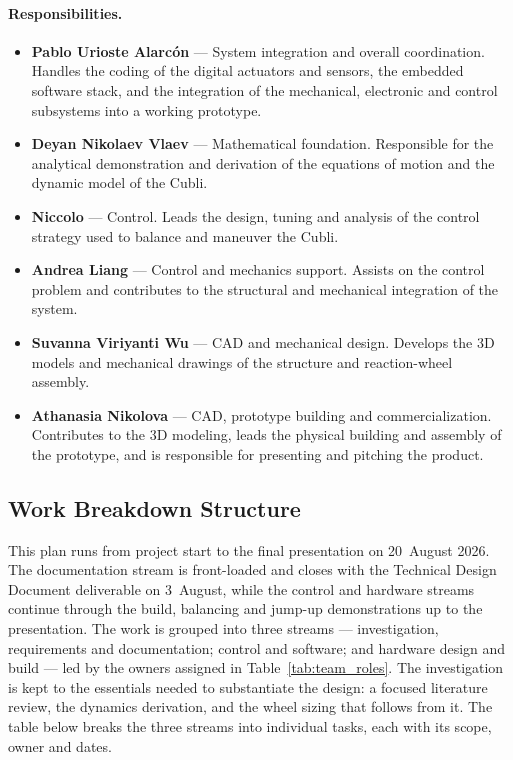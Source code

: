 \paragraph{Responsibilities.}
\begin{itemize}
    \item \textbf{Pablo Urioste Alarcón} --- System integration and overall
    coordination. Handles the coding of the digital actuators and sensors,
    the embedded software stack, and the integration of the mechanical,
    electronic and control subsystems into a working prototype.
    \item \textbf{Deyan Nikolaev Vlaev} --- Mathematical foundation. Responsible
    for the analytical demonstration and derivation of the equations of motion
    and the dynamic model of the Cubli.
    \item \textbf{Niccolo} --- Control. Leads the design, tuning and analysis of
    the control strategy used to balance and maneuver the Cubli.
    \item \textbf{Andrea Liang} --- Control and mechanics support. Assists on
    the control problem and contributes to the structural and mechanical
    integration of the system.
    \item \textbf{Suvanna Viriyanti Wu} --- CAD and mechanical design.
    Develops the 3D models and mechanical drawings of the structure and
    reaction-wheel assembly.
    \item \textbf{Athanasia Nikolova} --- CAD, prototype building and
    commercialization. Contributes to the 3D modeling, leads the physical
    building and assembly of the prototype, and is responsible for presenting
    and pitching the product.
\end{itemize}

\subsection{Work Breakdown Structure}
\label{sec:wbs}

This plan runs from project start to the final presentation on 20~August 2026.
The documentation stream is front-loaded and closes with the Technical Design
Document deliverable on 3~August, while the control and hardware streams continue
through the build, balancing and jump-up demonstrations up to the presentation.
The work is grouped into three streams --- investigation, requirements and
documentation; control and software; and hardware design and build --- led by
the owners assigned in Table~\ref{tab:team_roles}. The
investigation is kept to the essentials needed to substantiate the design:
a focused literature review, the dynamics derivation, and the wheel sizing that
follows from it. The table below breaks the three streams into individual tasks, each with its
scope, owner and dates.

